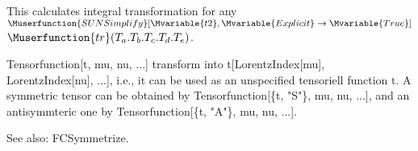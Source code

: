 This calculates integral transformation for any \(\Muserfunction{SUNSimplify}[\Mvariable{t2},\Mvariable{Explicit}\rightarrow \Mvariable{True}]\)
\(\Muserfunction{tr}({T_a}.{T_b}.{T_c}.{T_d}.{T_e})\).









Tensorfunction[t, mu, nu, ...] transform into t[LorentzIndex[mu], LorentzIndex[nu], ...], i.e., it can be used as an unspecified
  tensoriell function t. A symmetric tensor can be obtained by Tensorfunction[\{t, "S"\}, mu, nu, ...], and an antisymmteric one by
  Tensorfunction[\{t, "A"\}, mu, nu, ...].

See also:  FCSymmetrize.










